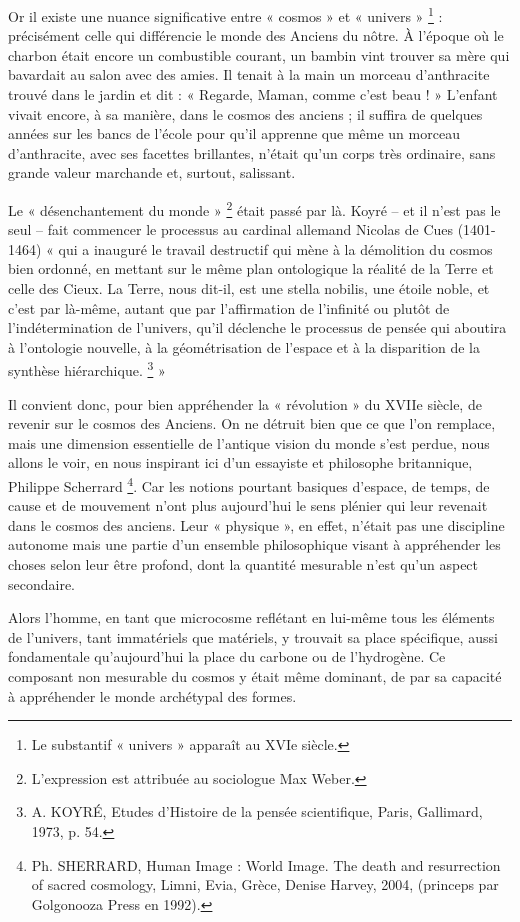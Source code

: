 \documentclass[a4paper,12pt]{article}
\begin{document}
Or il existe une nuance significative entre « cosmos » et « univers » \footnote{Le substantif « univers » apparaît au XVIe siècle.} : précisément celle qui différencie le monde des Anciens du nôtre. À l'époque où le charbon était encore un combustible courant, un bambin vint trouver sa mère qui bavardait au salon avec des amies. Il tenait à la main un morceau d'anthracite trouvé dans le jardin et dit : « Regarde, Maman, comme c’est beau ! » L'enfant vivait encore, à sa manière, dans le cosmos des anciens ; il suffira de quelques années sur les bancs de l'école pour qu'il apprenne que même un morceau d'anthracite, avec ses facettes brillantes, n'était qu'un corps très ordinaire, sans grande valeur marchande et, surtout, salissant.

Le « désenchantement du monde » \footnote{L’expression est attribuée au sociologue Max Weber.} était passé par là. Koyré – et il n'est pas le seul – fait commencer le processus au cardinal allemand Nicolas de Cues (1401-1464) « qui a inauguré le travail destructif qui mène à la démolition du cosmos bien ordonné, en mettant sur le même plan ontologique la réalité de la Terre et celle des Cieux. La Terre, nous dit-il, est une stella nobilis, une étoile noble, et c'est par là-même, autant que par l'affirmation de l'infinité ou plutôt de l'indétermination de l'univers, qu'il déclenche le processus de pensée qui aboutira à l'ontologie nouvelle, à la géométrisation de l'espace et à la disparition de la synthèse hiérarchique. \footnote{A. KOYRÉ, Etudes d’Histoire de la pensée scientifique, Paris, Gallimard, 1973, p. 54.} » 

Il convient donc, pour bien appréhender la « révolution » du XVIIe siècle, de revenir sur le cosmos des Anciens. On ne détruit bien que ce que l'on remplace, mais une dimension essentielle de l'antique vision du monde s'est perdue, nous allons le voir, en nous inspirant ici d'un essayiste et philosophe britannique, Philippe Scherrard \footnote{Ph. SHERRARD, Human Image : World Image. The death and resurrection of sacred cosmology, Limni, Evia, Grèce, Denise Harvey, 2004, (princeps par Golgonooza Press en 1992).}. Car les notions pourtant basiques d'espace, de temps, de cause et de mouvement n'ont plus aujourd'hui le sens plénier qui leur revenait dans le cosmos des anciens. Leur « physique », en effet, n'était pas une discipline autonome mais une partie d'un ensemble philosophique visant à appréhender les choses selon leur être profond, dont la quantité mesurable n'est qu'un aspect secondaire.

Alors l'homme, en tant que microcosme reflétant en lui-même tous les éléments de l'univers, tant immatériels que matériels, y trouvait sa place spécifique, aussi fondamentale qu’aujourd'hui la place du carbone ou de l'hydrogène. Ce composant non mesurable du cosmos y était même dominant, de par sa capacité à appréhender le monde archétypal des formes. 
\end{document}
